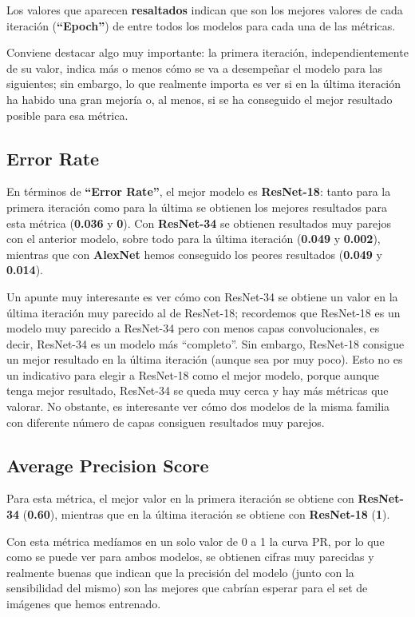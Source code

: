 Los valores que aparecen \textbf{resaltados} indican que son los mejores valores de cada iteración (\textbf{``Epoch''}) de entre todos los modelos para cada una de las métricas.

Conviene destacar algo muy importante: la primera iteración, independientemente de su valor, indica más o menos cómo se va a desempeñar el modelo para las siguientes; sin embargo, lo que realmente importa es ver si en la última iteración ha habido una gran mejoría o, al menos, si se ha conseguido el mejor resultado posible para esa métrica.

\subsection{Error Rate}

En términos de \textbf{``Error Rate''}, el mejor modelo es \textbf{ResNet-18}: tanto para la primera iteración como para la última se obtienen los mejores resultados para esta métrica (\textbf{0.036} y \textbf{0}). Con \textbf{ResNet-34} se obtienen resultados muy parejos con el anterior modelo, sobre todo para la última iteración (\textbf{0.049} y \textbf{0.002}), mientras que con \textbf{AlexNet} hemos conseguido los peores resultados (\textbf{0.049} y \textbf{0.014}).

Un apunte muy interesante es ver cómo con ResNet-34 se obtiene un valor en la última iteración muy parecido al de ResNet-18; recordemos que ResNet-18 es un modelo muy parecido a ResNet-34 pero con menos capas convolucionales, es decir, ResNet-34 es un modelo más ``completo''. Sin embargo, ResNet-18 consigue un mejor resultado en la última iteración (aunque sea por muy poco). Esto no es un indicativo para elegir a ResNet-18 como el mejor modelo, porque aunque tenga mejor resultado, ResNet-34 se queda muy cerca y hay más métricas que valorar. No obstante, es interesante ver cómo dos modelos de la misma familia con diferente número de capas consiguen resultados muy parejos.

\subsection{Average Precision Score}

Para esta métrica, el mejor valor en la primera iteración se obtiene con \textbf{ResNet-34} (\textbf{0.60}), mientras que en la última iteración se obtiene con \textbf{ResNet-18} (\textbf{1}).

Con esta métrica medíamos en un solo valor de 0 a 1 la curva \ac{PR}, por lo que como se puede ver para ambos modelos, se obtienen cifras muy parecidas y realmente buenas que indican que la precisión del modelo (junto con la sensibilidad del mismo) son las mejores que cabrían esperar para el set de imágenes que hemos entrenado.

